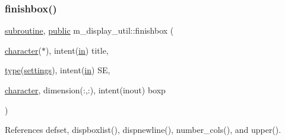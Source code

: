 \subsubsection{\texorpdfstring{finishbox()}{finishbox()}}
{\footnotesize\ttfamily \hyperlink{M__stopwatch_83_8txt_acfbcff50169d691ff02d4a123ed70482}{subroutine}, \hyperlink{M__stopwatch_83_8txt_a2f74811300c361e53b430611a7d1769f}{public} m\+\_\+display\+\_\+util\+::finishbox (\begin{DoxyParamCaption}\item[{\hyperlink{option__stopwatch_83_8txt_abd4b21fbbd175834027b5224bfe97e66}{character}($\ast$), intent(\hyperlink{M__journal_83_8txt_afce72651d1eed785a2132bee863b2f38}{in})}]{title,  }\item[{\hyperlink{stop__watch_83_8txt_a70f0ead91c32e25323c03265aa302c1c}{type}(\hyperlink{structm__display__util_1_1settings}{settings}), intent(\hyperlink{M__journal_83_8txt_afce72651d1eed785a2132bee863b2f38}{in})}]{SE,  }\item[{\hyperlink{option__stopwatch_83_8txt_abd4b21fbbd175834027b5224bfe97e66}{character}, dimension(\+:,\+:), intent(inout)}]{boxp }\end{DoxyParamCaption})}



References defset, dispboxlist(), dispnewline(), number\+\_\+cols(), and upper().

